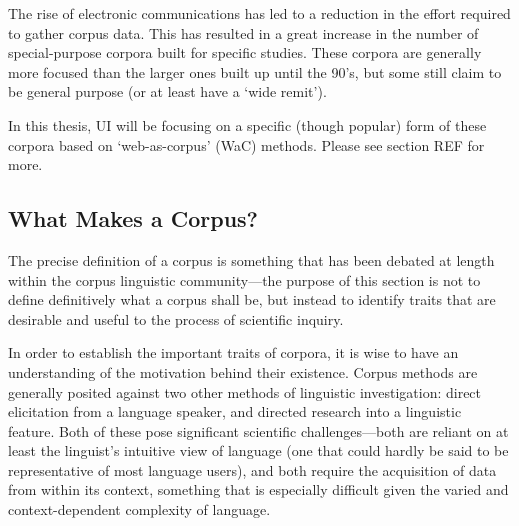 


The rise of electronic communications has led to a reduction in the effort required to gather corpus data.  This has resulted in a great increase in the number of special-purpose corpora built for specific studies.  These corpora are generally more focused than the larger ones built up until the 90's, but some still claim to be general purpose (or at least have a `wide remit').  


In this thesis, UI will be focusing on a specific (though popular) form of these corpora based on `web-as-corpus' (WaC) methods.  Please see section REF for more.




\subsection{What Makes a Corpus?} %

The precise definition of a corpus is something that has been debated at length within the corpus linguistic community---the purpose of this section is not to define definitively what a corpus shall be, but instead to identify traits that are desirable and useful to the process of scientific inquiry.



In order to establish the important traits of corpora, it is wise to have an understanding of the motivation behind their existence.  Corpus methods are generally posited against two other methods of linguistic investigation: direct elicitation from a language speaker, and directed research into a linguistic feature.  Both of these pose significant scientific challenges---both are reliant on at least the linguist's intuitive view of language (one that could hardly be said to be representative of most language users), and both require the acquisition of data from within its context, something that is especially difficult given the varied and context-dependent complexity of language.

